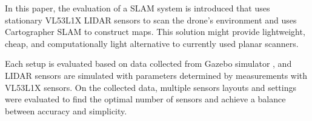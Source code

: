 \documentclass[conference]{IEEEtran}
\begin{document}
In this paper, the evaluation of a SLAM system is introduced that uses stationary VL53L1X LIDAR sensors to scan
the drone's environment and uses Cartographer SLAM\cite{filipenko2018comparison}\cite{cartographerPaper} to construct maps. This solution might provide lightweight,
cheap, and computationally light alternative to currently used planar scanners. 

Each setup is evaluated based on data collected from Gazebo simulator \cite{GazeboWebsite}, and LIDAR sensors are simulated with 
parameters determined by measurements with VL53L1X sensors. On the collected data, multiple sensors layouts and 
settings were evaluated to find the optimal number of sensors and achieve a balance between accuracy and simplicity.


%
%



%
%
\end{document}
